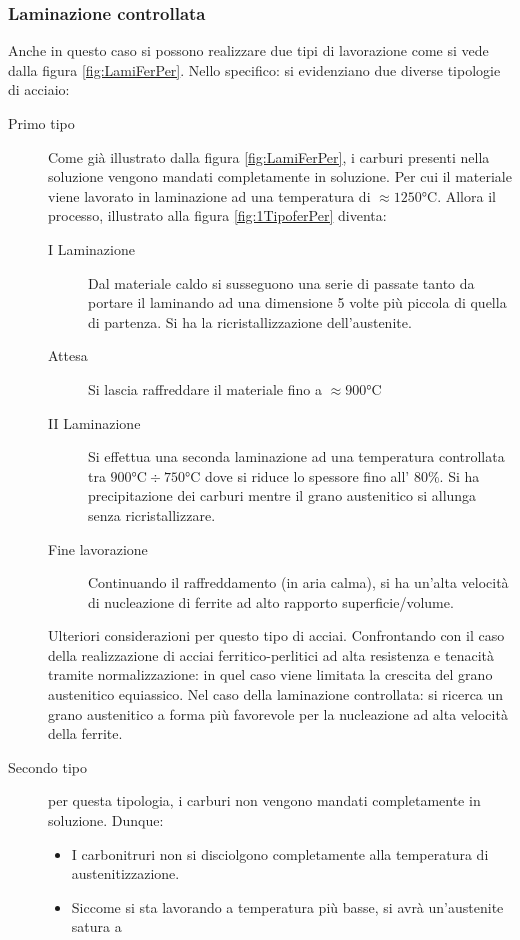 \subsubsection*{Laminazione controllata}
Anche in questo caso si possono realizzare due tipi di lavorazione come si vede
dalla figura \ref{fig:LamiFerPer}. Nello specifico: si evidenziano due diverse
tipologie di acciaio:
\begin{description}
\item[Primo tipo] Come già illustrato dalla figura \ref{fig:LamiFerPer}, i 
carburi presenti nella soluzione vengono mandati completamente in soluzione.
Per cui il materiale viene lavorato in laminazione ad una temperatura di 
$\approx 1250\unit{\celsius}$. Allora il processo, illustrato alla figura \ref{fig:1TipoferPer} diventa:
	\begin{description}
	\item[I Laminazione] Dal materiale caldo si susseguono una serie di passate
	tanto da portare il laminando ad una dimensione 5 volte più piccola di quella
	di partenza. Si ha la ricristallizzazione dell'austenite.
	\item[Attesa] Si lascia raffreddare il materiale fino a $\approx 900\unit{\celsius}$
	\item[II Laminazione] Si effettua una seconda laminazione ad una temperatura
	controllata tra $900\unit{\celsius} \div 750\unit{\celsius}$ dove si riduce lo spessore
	fino all' 80\%. Si ha precipitazione dei carburi mentre il grano austenitico si allunga
	senza ricristallizzare.
	\item[Fine lavorazione] Continuando il raffreddamento (in aria calma), si ha 
	un'alta velocità di nucleazione di ferrite ad alto rapporto superficie/volume.
	\end{description}
Ulteriori considerazioni per questo tipo di acciai. 
Confrontando con il caso della realizzazione di acciai ferritico-perlitici 
ad alta resistenza e tenacità tramite normalizzazione: in quel caso viene
limitata la crescita del grano austenitico equiassico.
Nel caso della laminazione controllata: si ricerca un grano austenitico a forma
più favorevole per la nucleazione ad alta velocità della ferrite.
\item[Secondo tipo] per questa tipologia, i carburi non vengono mandati completamente
in soluzione. Dunque:
	\begin{itemize}
	\item I carbonitruri non si disciolgono completamente alla temperatura di austenitizzazione.
	\item Siccome si sta lavorando a temperatura più basse, si avrà un'austenite satura a

\end{itemize}
\end{description}
